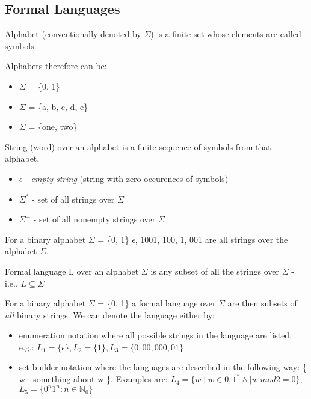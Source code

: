 \subsection{Formal Languages}

\begin{definition}
Alphabet (conventionally denoted by $\Sigma$) is a finite set whose elements are called symbols.
\end{definition}
Alphabets therefore can be:
\begin{itemize}
    \item $\Sigma$ = \{0, 1\}
    \item $\Sigma$ = \{a, b, c, d, e\}
    \item $\Sigma$ = \{one, two\}
\end{itemize}

\begin{definition}
String (word) over an alphabet is a finite sequence of symbols from that alphabet.
\end{definition}
\begin{itemize}
    \item $\epsilon$ - \textit{empty string} (string with zero occurences of symbols)
    \item $\Sigma^{*}$ - set of all strings over $\Sigma$
    \item $\Sigma^{+}$ - set of all nonempty strings over $\Sigma$
\end{itemize}
For a binary alphabet $\Sigma$ = \{0, 1\} $\epsilon$, 1001, 100, 1, 001 are all strings over the alphabet $\Sigma$.

\begin{definition}
Formal language L over an alphabet $\Sigma$ is any subset of all the strings over $\Sigma$ - i.e., $L \subseteq \Sigma$
\end{definition}
For a binary alphabet $\Sigma$ = \{0, 1\} a formal language over $\Sigma$ are then subsets of \textit{all} binary strings. We can denote the language either by:
\begin{itemize}
    \item enumeration notation where all possible strings in the language are listed, e.g.: $\textit{L}_1 = \{\epsilon\}, \textit{L}_2 = \{1\}, \textit{L}_3 = \{0, 00, 000, 01\}$ 
    \item set-builder notation where the languages are described in the following way: \{ w $\mid$ something about w \}. Examples are: $\textit{L}_4 = \{\textit{w} \mid \textit{w} \in {0,1}^* \wedge \left|\textit{w}\right| mod 2 = 0\}$, $\textit{L}_5 = \{0^\textit{n}1^\textit{n} : \textit{n} \in \mathbb{N}_0\}$
\end{itemize}

